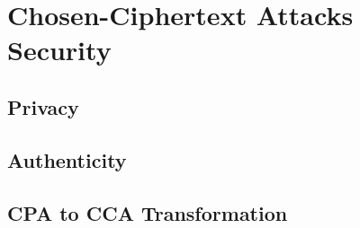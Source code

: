 \chapter{Chosen-Ciphertext Attacks Security}

\section{Privacy}\label{sec:cca-privacy}



\section{Authenticity}\label{sec:cca-auth}



\section{CPA to CCA Transformation}\label{sec:cca-transformation}



